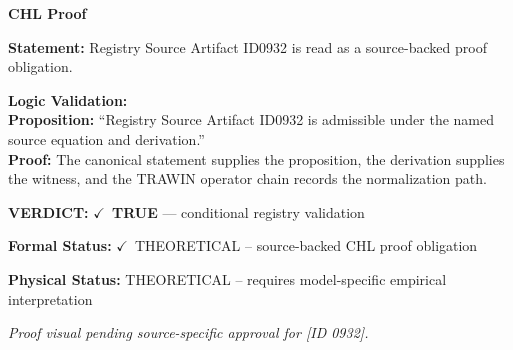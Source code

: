 \vspace{0.45em}
\noindent\textbf{CHL Proof}\par
\textbf{Statement:} Registry Source Artifact ID0932 is read as a source-backed proof obligation.

\textbf{Logic Validation:}\\
\textbf{Proposition:} ``Registry Source Artifact ID0932 is admissible under the named source equation and derivation.''\\
\textbf{Proof:} The canonical statement supplies the proposition, the derivation supplies the witness, and the TRAWIN operator chain records the normalization path.

\textbf{VERDICT:} \ensuremath{\checkmark}\ \textbf{TRUE} --- conditional registry validation

\textbf{Formal Status:} \ensuremath{\checkmark}\ THEORETICAL -- source-backed CHL proof obligation

\textbf{Physical Status:} THEORETICAL -- requires model-specific empirical interpretation
\par\vspace{0.45em}
\par
\vfill
\begingroup\footnotesize\itshape
Proof visual pending source-specific approval for [ID 0932].
\par\endgroup
\vfill
\endgroup
\endgroup

